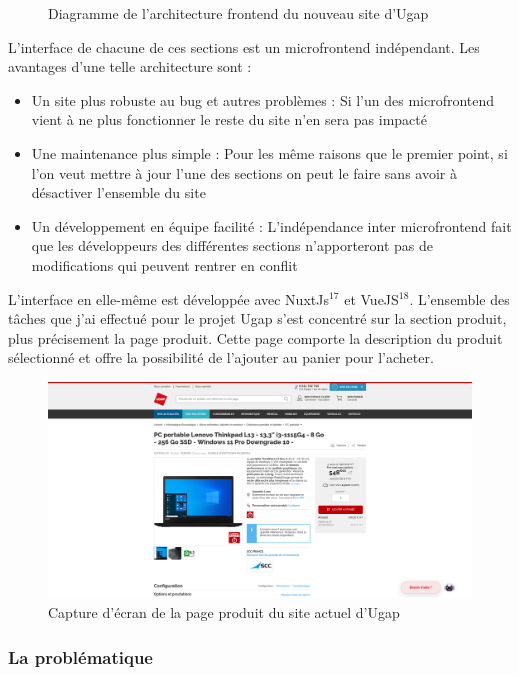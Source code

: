 \documentclass[12pt]{article}
\begin{document}
\begin {sloppypar}
\begin{figure}[h]
  \caption {Diagramme de l'architecture frontend du nouveau site d'Ugap}
\end{figure}
L'interface de chacune de ces sections est un microfrontend indépendant. Les avantages d'une telle 
architecture sont : 
\begin{itemize}
  \item 
    Un site plus robuste au bug et autres problèmes : Si l'un des microfrontend vient à ne plus 
    fonctionner le reste du site n'en sera pas impacté
  \item 
    Une maintenance plus simple : Pour les même raisons que le premier point, si l'on veut 
    mettre à jour l'une des sections on peut le faire sans avoir à désactiver l'ensemble du site 
  \item 
    Un développement en équipe facilité : L'indépendance inter microfrontend fait que les développeurs 
    des différentes sections n'apporteront pas de modifications qui peuvent rentrer en conflit
\end{itemize}
L'interface en elle-même est développée avec NuxtJs$^{17}$ et VueJS$^{18}$. L'ensemble des tâches 
que j'ai effectué pour le projet Ugap s'est concentré sur la section produit, plus précisement 
la page produit. Cette page comporte la description du produit sélectionné et offre la possibilité 
de l'ajouter au panier pour l'acheter.
\begin{figure}[h]
  \includegraphics[width=\textwidth] {sc_product-page.png}
  \caption {Capture d'écran de la page produit du site actuel d'Ugap}
\end{figure}
\newpage 
\subsubsection{La problématique}

\end{sloppypar}
\end{document}
